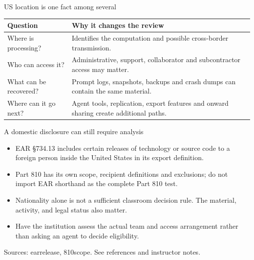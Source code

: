 \documentclass[aspectratio=169,11pt]{beamer}
\begin{document}
\begin{frame}[t,fragile]{US location is one fact among several}
\fontsize{10.5}{12.5}\selectfont\setlength{\tabcolsep}{4pt}\renewcommand{\arraystretch}{1.15}
\begin{tabular}{>{\raggedright\arraybackslash}p{}>{\raggedright\arraybackslash}p{}}
\toprule
\textbf{Question} & \textbf{Why it changes the review} \\ \midrule
Where is processing? & Identifies the computation and possible cross-border transmission. \\[2pt]
Who can access it? & Administrative, support, collaborator and subcontractor access may matter. \\[2pt]
What can be recovered? & Prompt logs, snapshots, backups and crash dumps can contain the same material. \\[2pt]
Where can it go next? & Agent tools, replication, export features and onward sharing create additional paths. \\[2pt]
\bottomrule\end{tabular}\par\vspace{2mm}
\end{frame}
\begin{frame}[t,fragile]{A domestic disclosure can still require analysis}
\fontsize{11.5}{14}\selectfont
\begin{itemize}\setlength{\itemsep}{2mm}
\item EAR \S{}734.13 includes certain releases of technology or source code to a foreign person inside the United States in its export definition.
\item Part 810 has its own scope, recipient definitions and exclusions; do not import EAR shorthand as the complete Part 810 test.
\item Nationality alone is not a sufficient classroom decision rule. The material, activity, and legal status also matter.
\item Have the institution assess the actual team and access arrangement rather than asking an agent to decide eligibility.
\end{itemize}
\vfill{\fontsize{6.5}{8}\selectfont\color{UTgray} Sources: earrelease, 810scope. See references and instructor notes.\par}
\end{frame}
\end{document}
